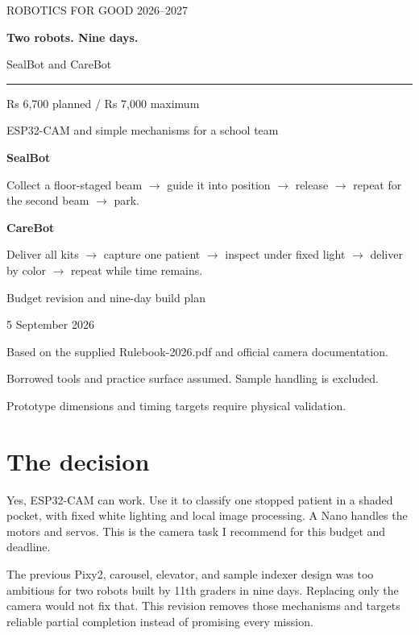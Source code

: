 \documentclass[10pt,a4paper]{article}
\begin{document}
\begin{titlepage}
\color{ink}
\vspace*{20mm}
{\large ROBOTICS FOR GOOD 2026--2027\par}
\vspace{9mm}
{\Huge\bfseries Two robots. Nine days.\par}
\vspace{7mm}
{\Large SealBot and CareBot\par}
\vspace{12mm}
\rule{\linewidth}{1pt}
\vspace{8mm}
{\large Rs 6,700 planned / Rs 7,000 maximum\par}
{\large ESP32-CAM and simple mechanisms for a school team\par}
\vspace{12mm}
\textbf{SealBot}\par
Collect a floor-staged beam $\rightarrow$ guide it into position $\rightarrow$ release
$\rightarrow$ repeat for the second beam $\rightarrow$ park.\par
\vspace{6mm}
\textbf{CareBot}\par
Deliver all kits $\rightarrow$ capture one patient $\rightarrow$ inspect under fixed light
$\rightarrow$ deliver by color $\rightarrow$ repeat while time remains.\par
\vfill
\color{black}
Budget revision and nine-day build plan\par
5 September 2026\par
Based on the supplied Rulebook-2026.pdf and official camera documentation.\par
Borrowed tools and practice surface assumed. Sample handling is excluded.\par
Prototype dimensions and timing targets require physical validation.
\end{titlepage}
\tableofcontents
\clearpage
{}\section{The decision}
Yes, ESP32-CAM can work. Use it to classify one stopped patient in a shaded pocket, with fixed white lighting and local image processing. A Nano handles the motors and servos. This is the camera task I recommend for this budget and deadline.

The previous Pixy2, carousel, elevator, and sample indexer design was too ambitious for two robots built by 11th graders in nine days. Replacing only the camera would not fix that. This revision removes those mechanisms and targets reliable partial completion instead of promising every mission.
\end{document}

